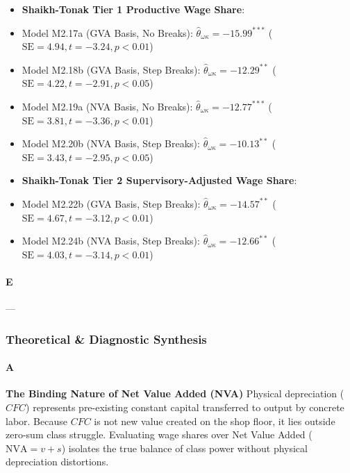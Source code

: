 \begin{itemize}
	\item \textbf{Shaikh-Tonak Tier 1 Productive Wage Share}:
	\item Model M2.17a (GVA Basis, No Breaks): $\hat{\theta}_{\omega\kappa} = -15.99^{***}$ ($\text{SE} = 4.94, t = -3.24, p < 0.01$)
	\item Model M2.18b (GVA Basis, Step Breaks): $\hat{\theta}_{\omega\kappa} = -12.29^{**}$ ($\text{SE} = 4.22, t = -2.91, p < 0.05$)
	\item Model M2.19a (NVA Basis, No Breaks): $\hat{\theta}_{\omega\kappa} = -12.77^{***}$ ($\text{SE} = 3.81, t = -3.36, p < 0.01$)
	\item Model M2.20b (NVA Basis, Step Breaks): $\hat{\theta}_{\omega\kappa} = -10.13^{**}$ ($\text{SE} = 3.43, t = -2.95, p < 0.05$)
\end{itemize}

\begin{itemize}
	\item \textbf{Shaikh-Tonak Tier 2 Supervisory-Adjusted Wage Share}:
	\item Model M2.22b (GVA Basis, Step Breaks): $\hat{\theta}_{\omega\kappa} = -14.57^{**}$ ($\text{SE} = 4.67, t = -3.12, p < 0.01$)
	\item Model M2.24b (NVA Basis, Step Breaks): $\hat{\theta}_{\omega\kappa} = -12.66^{**}$ ($\text{SE} = 4.03, t = -3.14, p < 0.01$)
\end{itemize}

\paragraph{E}
---

\subsubsection{Theoretical \& Diagnostic Synthesis}

\paragraph{A}
\textbf{The Binding Nature of Net Value Added (NVA)}
Physical depreciation ($CFC$) represents pre-existing constant capital transferred to output by concrete labor. Because $CFC$ is not new value created on the shop floor, it lies outside zero-sum class struggle. Evaluating wage shares over Net Value Added ($\text{NVA} = v + s$) isolates the true balance of class power without physical depreciation distortions.

